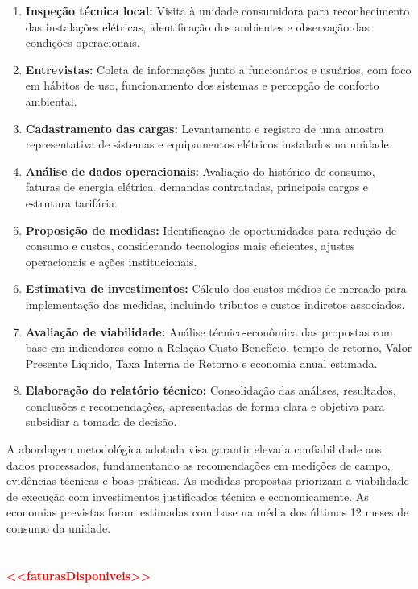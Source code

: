 \begin{enumerate}
    \item \textbf{Inspeção técnica local:} Visita à unidade consumidora para reconhecimento das instalações elétricas, identificação dos ambientes e observação das condições operacionais.
    
    \item \textbf{Entrevistas:} Coleta de informações junto a funcionários e usuários, com foco em hábitos de uso, funcionamento dos sistemas e percepção de conforto ambiental.
    
    \item \textbf{Cadastramento das cargas:} Levantamento e registro de uma amostra representativa de sistemas e equipamentos elétricos instalados na unidade.
    
    \item \textbf{Análise de dados operacionais:} Avaliação do histórico de consumo, faturas de energia elétrica, demandas contratadas, principais cargas e estrutura tarifária.
    
    \item \textbf{Proposição de medidas:} Identificação de oportunidades para redução de consumo e custos, considerando tecnologias mais eficientes, ajustes operacionais e ações institucionais.
    
    \item \textbf{Estimativa de investimentos:} Cálculo dos custos médios de mercado para implementação das medidas, incluindo tributos e custos indiretos associados.
    
    \item \textbf{Avaliação de viabilidade:} Análise técnico-econômica das propostas com base em indicadores como a Relação Custo-Benefício, tempo de retorno, Valor Presente Líquido, Taxa Interna de Retorno e economia anual estimada.
    
    \item \textbf{Elaboração do relatório técnico:} Consolidação das análises, resultados, conclusões e recomendações, apresentadas de forma clara e objetiva para subsidiar a tomada de decisão.
\end{enumerate}

A abordagem metodológica adotada visa garantir elevada confiabilidade aos dados processados, fundamentando as recomendações em medições de campo, evidências técnicas e boas práticas. As medidas propostas priorizam a viabilidade de execução com investimentos justificados técnica e economicamente. As economias previstas foram estimadas com base na média dos últimos 12 meses de consumo da unidade. 
\\\\\\
{\textcolor{red}{\textbf{<<faturasDisponiveis>>}}}





